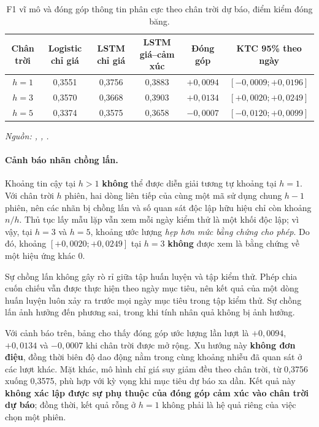 \documentclass[12pt, a4paper, oneside]{report}
\begin{document}
\begin{table}[H]
  \centering
  \caption{F1 vĩ mô và đóng góp thông tin phân cực theo chân trời dự báo, điểm kiểm đóng băng.}
  \label{tab:kq-horizon}
  \begin{tabular}{c c c c c c}
    \toprule
    Chân trời & Logistic chỉ giá & LSTM chỉ giá & LSTM giá--cảm xúc & Đóng góp & KTC 95\% theo ngày \\
    \midrule
    $h = 1$ & 0,3551 & 0,3756 & 0,3883 & $+0{,}0094$ & $[-0{,}0009; +0{,}0196]$ \\
    $h = 3$ & 0,3570 & 0,3668 & 0,3903 & $+0{,}0134$ & $[+0{,}0020; +0{,}0249]$ \\
    $h = 5$ & 0,3374 & 0,3575 & 0,3658 & $-0{,}0007$ & $[-0{,}0120; +0{,}0099]$ \\
    \bottomrule
  \end{tabular}
\noindent\textit{Nguồn: , , .}
\end{table}

\paragraph{Cảnh báo nhãn chồng lấn.}
Khoảng tin cậy tại $h > 1$ \textbf{không} thể được diễn giải tương tự khoảng tại $h = 1$. Với chân trời $h$ phiên, hai dòng liên tiếp của cùng một mã sử dụng chung $h - 1$ phiên, nên các nhãn bị chồng lấn và số quan sát độc lập hữu hiệu chỉ còn khoảng $n/h$. Thủ tục lấy mẫu lặp vẫn xem mỗi ngày kiểm thử là một khối độc lập; vì vậy, tại $h = 3$ và $h = 5$, khoảng ước lượng \emph{hẹp hơn mức bằng chứng cho phép}. Do đó, khoảng $[+0{,}0020; +0{,}0249]$ tại $h = 3$ \textbf{không} được xem là bằng chứng về một hiệu ứng khác 0.

Sự chồng lấn không gây rò rỉ giữa tập huấn luyện và tập kiểm thử. Phép chia cuốn chiếu vẫn được thực hiện theo ngày mục tiêu, nên kết quả của một dòng huấn luyện luôn xảy ra trước mọi ngày mục tiêu trong tập kiểm thử. Sự chồng lấn ảnh hưởng đến phương sai, trong khi tính nhân quả không bị ảnh hưởng.

Với cảnh báo trên, bảng cho thấy đóng góp ước lượng lần lượt là $+0{,}0094$, $+0{,}0134$ và $-0{,}0007$ khi chân trời được mở rộng. Xu hướng này \textbf{không đơn điệu}, đồng thời biên độ dao động nằm trong cùng khoảng nhiễu đã quan sát ở các lượt khác. Mặt khác, mô hình chỉ giá suy giảm đều theo chân trời, từ 0,3756 xuống 0,3575, phù hợp với kỳ vọng khi mục tiêu dự báo xa dần. Kết quả này \textbf{không xác lập được sự phụ thuộc của đóng góp cảm xúc vào chân trời dự báo}; đồng thời, kết quả rỗng ở $h = 1$ không phải là hệ quả riêng của việc chọn một phiên.
\end{document}
